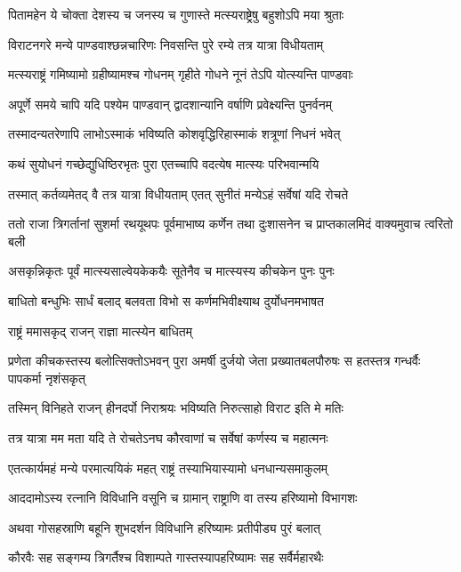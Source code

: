 \twolineshloka
{पितामहेन ये चोक्ता देशस्य च जनस्य च}
{गुणास्ते मत्स्यराष्ट्रेषु बहुशोऽपि मया श्रुताः}


\twolineshloka
{विराटनगरे मन्ये पाण्डवाश्छन्नचारिणः}
{निवसन्ति पुरे रम्ये तत्र यात्रा विधीयताम्}


\twolineshloka
{मत्स्यराष्ट्रं गमिष्यामो ग्रहीष्यामश्च गोधनम्}
{गृहीते गोधने नूनं तेऽपि योत्स्यन्ति पाण्डवाः}


\twolineshloka
{अपूर्णे समये चापि यदि पश्येम पाण्डवान्}
{द्वादशान्यानि वर्षाणि प्रवेक्ष्यन्ति पुनर्वनम्}


\twolineshloka
{तस्मादन्यतरेणापि लाभोऽस्माकं भविष्यति}
{कोशवृद्धिरिहास्माकं शत्रूणां निधनं भवेत्}


\twolineshloka
{कथं सुयोधनं गच्छेद्युधिष्ठिरभृतः पुरा}
{एतच्चापि वदत्येष मात्स्यः परिभवान्मयि}


\twolineshloka
{तस्मात् कर्तव्यमेतद् वै तत्र यात्रा विधीयताम्}
{एतत् सुनीतं मन्येऽहं सर्वेषां यदि रोचते}



\threelineshloka
{ततो राजा त्रिगर्तानां सुशर्मा रथयूथपः}
{पूर्वमाभाष्य कर्णेन तथा दुःशासनेन च}
{प्राप्तकालमिदं वाक्यमुवाच त्वरितो बली}


\twolineshloka
{असकृन्निकृतः पूर्वं मात्स्यसाल्वेयकेकयैः}
{सूतेनैव च मात्स्यस्य कीचकेन पुनः पुनः}


\twolineshloka
{बाधितो बन्धुभिः सार्धं बलाद् बलवता विभो}
{स कर्णमभिवीक्ष्याथ दुर्योधनमभाषत}


\onelineshloka
{राष्ट्रं ममासकृद् राजन् राज्ञा मात्स्येन बाधितम्}


\threelineshloka
{प्रणेता कीचकस्तस्य बलोत्सिक्तोऽभवन् पुरा}
{अमर्षी दुर्जयो जेता प्रख्यातबलपौरुषः}
{स हतस्तत्र गन्धर्वैः पापकर्मा नृशंसकृत्}


\twolineshloka
{तस्मिन् विनिहते राजन् हीनदर्पो निराश्रयः}
{भविष्यति निरुत्साहो विराट इति मे मतिः}


\twolineshloka
{तत्र यात्रा मम मता यदि ते रोचतेऽनघ}
{कौरवाणां च सर्वेषां कर्णस्य च महात्मनः}


\twolineshloka
{एतत्कार्यमहं मन्ये परमात्ययिकं महत्}
{राष्ट्रं तस्याभियास्यामो धनधान्यसमाकुलम्}


\twolineshloka
{आददामोऽस्य रत्नानि विविधानि वसूनि च}
{ग्रामान् राष्ट्राणि वा तस्य हरिष्यामो विभागशः}


\twolineshloka
{अथवा गोसहस्राणि बहूनि शुभदर्शन}
{विविधानि हरिष्यामः प्रतीपीड्य पुरं बलात्}


\twolineshloka
{कौरवैः सह सङ्गम्य त्रिगर्तैश्च विशाम्पते}
{गास्तस्यापहरिष्यामः सह सर्वैर्महारथैः}


